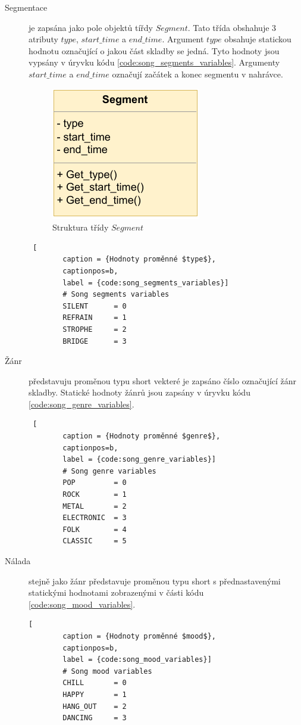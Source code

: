 \begin{description}
    \item[Segmentace] je zapsána jako pole objektů tířdy $Segment$. Tato třída obshahuje 3 atributy $type$, $start\_time$ a $end\_time$. Argument $type$ obsahuje statickou hodnotu označující o jakou část skladby se jedná. Tyto hodnoty jsou vypsány v úryvku kódu \ref{code:song_segments_variables}.
    Argumenty $start\_time$ a $end\_time$ označují začátek a konec segmentu v nahrávce. 

    \begin{figure}[H]
        \centering
        \includegraphics[width = 0.3\linewidth]{obrazky/UML_diagram_Segment.pdf}
        \caption{Struktura třídy $Segment$}
        \label{fig:Loudness_Segment_diagram}
    \end{figure}
    \begin{lstlisting} [
        caption = {Hodnoty proměnné $type$},
        captionpos=b,
        label = {code:song_segments_variables}]
        # Song segments variables
        SILENT      = 0
        REFRAIN     = 1
        STROPHE     = 2
        BRIDGE      = 3
    \end{lstlisting}

    \item[Žánr] představuju proměnou typu short vekteré je zapsáno číslo označující žánr skladby. Statické hodnoty žánrů jsou zapsány v úryvku kódu \ref{code:song_genre_variables}.
    \begin{lstlisting} [
        caption = {Hodnoty proměnné $genre$},
        captionpos=b,
        label = {code:song_genre_variables}]
        # Song genre variables
        POP         = 0
        ROCK        = 1
        METAL       = 2
        ELECTRONIC  = 3
        FOLK        = 4
        CLASSIC     = 5
    \end{lstlisting}
    \item[Nálada] stejně jako žánr představuje proměnou typu short s přednastavenými statickými hodnotami zobrazenými v části kódu \ref{code:song_mood_variables}.
    \begin{lstlisting}[
        caption = {Hodnoty proměnné $mood$},
        captionpos=b,
        label = {code:song_mood_variables}]
        # Song mood variables
        CHILL       = 0
        HAPPY       = 1
        HANG_OUT    = 2
        DANCING     = 3
    \end{lstlisting}
    
\end{description}

